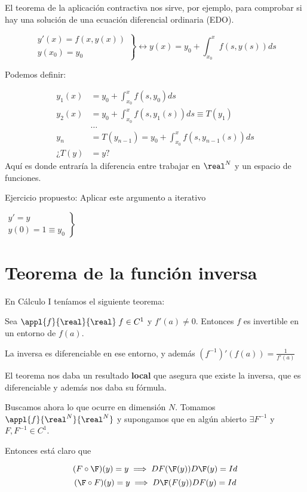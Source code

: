 El teorema de la aplicación contractiva nos sirve, por ejemplo, para comprobar si hay una solución de una ecuación diferencial ordinaria (EDO).

$$\left.\begin{matrix}y'(x) = f(x,y(x))\\
        y(x_0) = y_0
       \end{matrix}\right\} \leftrightarrow y(x) = y_0 + \int_{x_0}^x f(s,y(s)) ds$$

Podemos definir:

\begin{align*}
y_1(x) &= y_0 + \int_{x_0}^{x} f(s,y_0)ds\\
y_2(x) &= y_0 + \int_{x_0}^x f(s,y_1(s))ds \equiv T(y_1)\\
&\dots\\
y_n &= T(y_{n-1}) =  y_0 + \int_{x_0}^x f(s,y_{n-1}(s))ds\\
¿T(y) &= y?
\end{align*}
Aquí es donde entraría la diferencia entre trabajar en $\real^N$ y un espacio de funciones.

Ejercicio propuesto: Aplicar este argumento a iterativo

$\left. \begin{matrix} y' = y\\
         y(0) = 1 \equiv y_0
        \end{matrix}\right\}$

        
\section{Teorema de la función inversa}
En Cálculo I teníamos el siguiente teorema:
\begin{theorem} Sea $\appl{f}{\real}{\real}\; f\in C^1$ y $f'(a) \neq 0$. Entonces $f$ es invertible en un entorno de $f(a)$. 

La inversa es diferenciable en ese entorno, y además $(f^{-1})'(f(a)) = \frac{1}{f'(a)}$
\end{theorem}

El teorema nos daba un resultado \textbf{local} que asegura que existe la inversa, que es diferenciable y además nos daba su fórmula. 

Buscamos ahora lo que ocurre en dimensión $N$. Tomamos $\appl{f}{\real^N}{\real^N}$ y supongamos que en algún abierto $\exists F^{-1}$ y $F,F^{-1} \in  C^1$.

Entonces está claro que

\[ (F\circ \F)(y) = y \implies DF(\F(y))D\F(y) = Id \]
\[ (\F\circ F)(y) = y \implies D\F(F(y))DF(y) = Id \]

